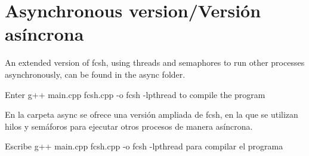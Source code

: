 \section*{Asynchronous version/\-Versión asíncrona }

An extended version of fcsh, using threads and semaphores to run other processes asynchronously, can be found in the {\ttfamily async} folder.

Enter {\ttfamily g++ main.\-cpp fcsh.\-cpp -\/o fcsh -\/lpthread} to compile the program

En la carpeta {\ttfamily async} se ofrece una versión ampliada de fcsh, en la que se utilizan hilos y semáforos para ejecutar otros procesos de manera asíncrona.

Escribe {\ttfamily g++ main.\-cpp fcsh.\-cpp -\/o fcsh -\/lpthread} para compilar el programa 